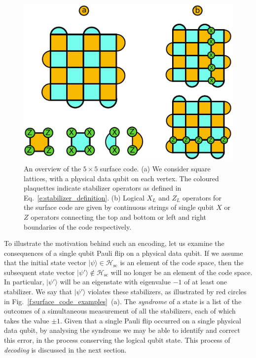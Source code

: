 \documentclass[twocolumn,preprintnumbers,amsmath,amssymb,notitlepage,nofootinbib,longbibliography,superscriptaddress,aps,pra,10pt]{revtex4-1}
\begin{document}
	\begin{figure}
		\centering
		\includegraphics[width=0.8\linewidth]{figures/surface_code.pdf}
		\caption{
			An overview of the $5 \times 5$ surface code.
			(a) We consider square lattices, with a physical data qubit on each vertex.
			The coloured plaquettes indicate stabilizer operators as defined in Eq.~\eqref{e:stabilizer_definition}.
			(b) Logical $X_L$ and $Z_L$ operators for the surface code are given by continuous strings of single qubit $X$ or $Z$ operators connecting the top and bottom or left and right boundaries of the code respectively.
		}
		\label{f:surface_code}
	\end{figure}

	To illustrate the motivation behind such an encoding, let us examine the consequences of a single qubit Pauli flip on a physical data qubit.
	If we assume that the initial state vector $|\psi\rangle \in \mathcal{H}_\mathrm{sc}$ is an element of the code space, then the subsequent state 
	vector $|\psi'\rangle \not \in \mathcal{H}_\mathrm{sc}$ will no longer be an element of the code space.
	In particular, $|\psi'\rangle$ will be an eigenstate with eigenvalue $-1$ of at least one stabilizer.
	We say that $|\psi'\rangle$ violates these stabilizers, as illustrated by red circles in Fig.~\ref{f:surface_code_examples}~(a).
	The \textit{syndrome} of a state is a list of the outcomes of a simultaneous measurement of all the stabilizers, each of which takes the value $\pm 1$.
	Given that a single Pauli flip occurred on a single physical data qubit, by analysing the syndrome we may be able to identify and correct this error, in the process conserving the logical qubit state.
	This process of \textit{decoding} is discussed in the next section.
\end{document}
